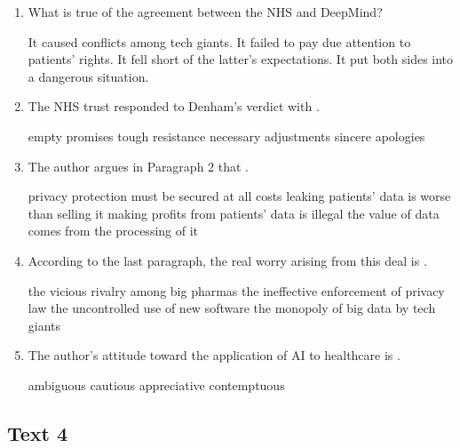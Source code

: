 \begin{enumerate}[resume]
	\item
 What is true of the agreement between the NHS and DeepMind?


\fourchoices
{It caused conflicts among tech giants.}
{It failed to pay due attention to patients' rights.}
{It fell short of the latter's expectations.}
{It put both sides into a dangerous situation.}





\item
The NHS trust responded to Denham's verdict with \lineread.


\fourchoices
{empty promises}
{tough resistance}
{necessary adjustments}
{sincere apologies}



\item
The author argues in Paragraph 2 that \lineread.


\fourchoices
{privacy protection must be secured at all costs}
{leaking patients' data is worse than selling it}
{making profits from patients' data is illegal}
{the value of data comes from the processing of it}





\item
 According to the last paragraph, the real worry arising from this
deal is \lineread.


\fourchoices
{the vicious rivalry among big pharmas}
{the ineffective enforcement of privacy law}
{the uncontrolled use of new software}
{the monopoly of big data by tech giants}


\item
The author's attitude toward the application of AI to healthcare is \lineread.


\fourchoices
{ambiguous}
{cautious}
{appreciative}
{contemptuous}

	
\end{enumerate}


\newpage
\subsection{Text 4}


